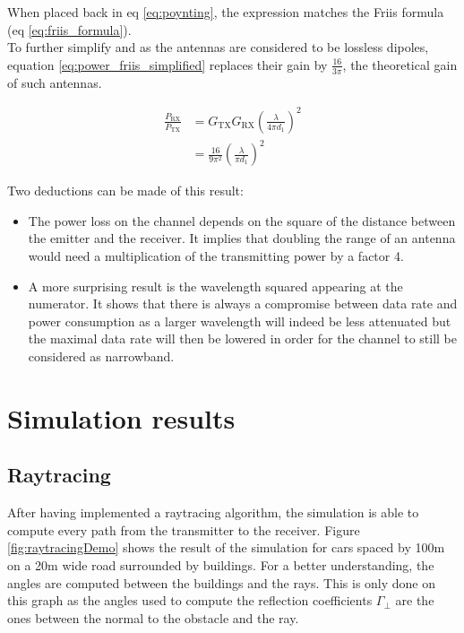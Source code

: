 \documentclass[10pt,a4paper]{ULBreport}
\begin{document}
When placed back in eq \ref{eq:poynting}, the expression matches the Friis formula (eq \ref{eq:friis_formula}). \\
To further simplify and as the antennas are considered to be lossless dipoles, equation \ref{eq:power_friis_simplified} replaces their gain by $\frac{16}{3\pi}$, the theoretical gain of such antennas.

\begin{align}
    \frac{P_{\text{RX}}}{P_{\text{TX}}} &= G_{\text{TX}} G_{\text{RX}} \left(\frac{\lambda}{4\pi d_1}\right)^2\\
    \label{eq:power_friis_simplified}
    &= \frac{16}{9\pi^2} \left(\frac{\lambda}{\pi d_1}\right)^2
\end{align}

Two deductions can be made of this result: 
\begin{itemize}
    \item The power loss on the channel depends on the square of the distance between the emitter and the receiver. It implies that doubling the range of an antenna would need a multiplication of the transmitting power by a factor 4.
    \item A more surprising result is the wavelength squared appearing at the numerator. It shows that there is always a compromise between data rate and power consumption as a larger wavelength will indeed be less attenuated but the maximal data rate will then be lowered in order for the channel to still be considered as narrowband.
\end{itemize}

\chapter{Simulation results}
\section{Raytracing}

After having implemented a raytracing algorithm, the simulation is able to compute every path from the transmitter to the receiver. Figure \ref{fig:raytracingDemo} shows the result of the simulation for cars spaced by 100m on a 20m wide road surrounded by buildings. For a better understanding, the angles are computed between the buildings and the rays. This is only done on this graph as the angles used to compute the reflection coefficients $\Gamma_{\perp}$ are the ones between the normal to the obstacle and the ray.
\end{document}
